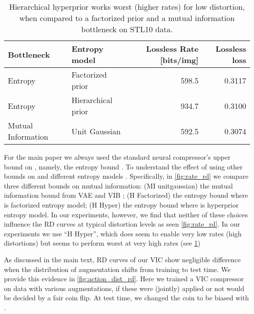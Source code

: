 \documentclass[final]{article}
\begin{document}
\begin{table}[h]
\caption{Hierarchical hyperprior works worst (higher rates) for low distortion, when compared to a factorized prior and a mutual information bottleneck on STL10 data.
}
\begin{center}
\small
\begin{tabular}{llrr}
\toprule
Bottleneck & Entropy model & Lossless Rate [bits/img] & Lossless loss\\ 
\midrule 
Entropy       &Factorized prior \cite{balle_variational_2018} 		               & 598.5 	& 0.3117 \\
Entropy        &Hierarchical prior \cite{balle_variational_2018}  & 934.7  & 0.3100 \\ 
Mutual Information       & Unit Gaussian 	                                                   & 592.5  & 0.3074 \\
\bottomrule
\end{tabular}
\end{center}
\label{table:rate_variation_aurd}
\end{table} 
For the main paper we always used the standard \cite{balle_end--end_2017} neural compressor's upper bound on , namely, the entropy bound .
To understand the effect of using other bounds on  and different entropy models .
Specifically, in \cref{fig:rate_rd} we compare three different bounds on mutual information:
(MI unitgaussian) the mutual information bound from VAE and VIB ;
(H Factorized) the entropy bound  where  is  factorized entropy model;
(H Hyper) the entropy bound where  is  hyperprior entropy model.
In our experiments, however, we find that neither of these choices influence the RD curves at typical distortion levels as seen \cref{fig:rate_rd}. 
In our experiments we use ``H Hyper'', which does seem to enable very low rates (high distortions) but seems to perform worst at very high rates (see \cref{table:rate_variation_aurd})



As discussed in the main text, RD curves of our VIC show negligible difference when the distribution of augmentation shifts from training to test time.
We provide this evidence in \cref{fig:action_dist_rd}. Here we trained a VIC compressor on data with various augmentations, if these were (jointly) applied or not would be decided by a fair coin flip. At test time, we changed the coin to be biased with . 
\end{document}

